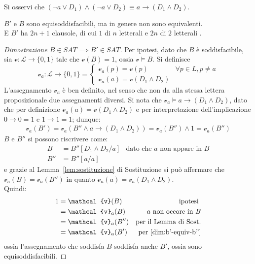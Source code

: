 Si osservi che $(\neg a \lor D_1) \land (\neg a \lor D_2) \equiv a \rightarrow (D_1 \land D_2)$. \\
\begin{lem}
$B'$ e $B$ sono equisoddisfacibili, ma in genere non sono equivalenti.\\
E $B'$ ha $2n + 1$ clausole, di cui $1$ di $n$ letterali e $2n$ di $2$ letterali .
\end{lem}
\begin{proof}[Dimostrazione $B \in SAT \implies B' \in SAT$]
        Per ipotesi, dato che $B$ è soddisfacibile, sia $\mathcal{v}:\mathscr{L} \rightarrow \{0,1\}$
        tale che $\mathcal{v}(B) = 1$, ossia $\mathcal{v} \models B$. 
        Si definisce 
        $$
        \mathcal{v}_a: \mathscr{L} \rightarrow \{0,1\} = 
        \begin{cases}
                \mathcal{v}_a(p) = \mathcal{v}(p) & \forall p \in L, p \neq a \\
                \mathcal{v}_a(a) = \mathcal{v}(D_1 \land D_2) 
        \end{cases} 
        $$
        L'assegnamento $\mathcal{v}_a$ è ben definito, nel senso che non 
        da alla stessa lettera proposizionale due assegnamenti diversi.
        Si nota che $\mathcal{v}_a \models a \rightarrow (D_1 \land D_2)$, 
        dato che per definizione $\mathcal{v}_a(a) = \mathcal{v}(D_1 \land D_2)$
        e per interpretazione dell'implicazione $0 \rightarrow 0 = 1$ e 
        $1 \rightarrow 1 = 1$; dunque:
        \begin{align}
        \label{dim:b'-equiv-b''}
        \mathcal{v}_a(B') = \mathcal{v}_a(B'' \land a \rightarrow (D_1 \land D_2)) = \mathcal{v}_a(B'') \land 1 = \mathcal{v}_a(B'')
        \end{align}
        $B$ e $B''$ si possono riscrivere come: 
        \begin{align*}
        B & = B''[D_1 \land D_2/a] & \text{dato che } a \text{ non appare in } B \\
        B'' & = B''[a/a]
        \end{align*}
        e grazie al Lemma~\ref{lem:sostituzione} di Sostituzione si può affermare che $\mathcal{v}_a(B) = \mathcal{v}_a(B'')$ in quanto $\mathcal{v}_a(a) = \mathcal{v}_a(D_1 \land D_2)$. \\
        Quindi:
        \begin{align*}
                1 &= \mathcal{v}(B) & \text{ipotesi } \\
                  &= \mathcal{v}_a(B) & a \text{ non occore in } B \\
                  &= \mathcal{v}_a(B'') & \text{per il Lemma di Sost.}  \\
                  &= \mathcal{v}_a(B') & \text{per~\ref{dim:b'-equiv-b''}}
        \end{align*}
        ossia l'assegnamento che soddisfa $B$ soddisfa anche $B'$, ossia 
        sono equisoddisfacibili. 
\end{proof}
